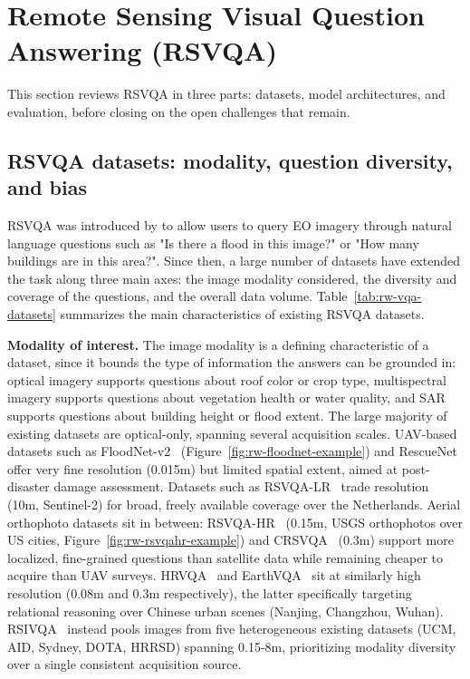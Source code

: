 \section{Remote Sensing Visual Question Answering (RSVQA)}
\label{sec:rw-vqa}
This section reviews RSVQA in three parts: datasets, model architectures, and evaluation, before closing on the open challenges that remain.
\subsection{RSVQA datasets: modality, question diversity, and bias}
\label{sec:rw-vqa-datasets}

RSVQA was introduced by \textcite{lobry2020rsvqa} to allow users to query EO imagery through natural language questions such as "Is there a flood in this image?" or "How many buildings are in this area?". Since then, a large number of datasets have extended the task along three main axes: the image modality considered, the diversity and coverage of the questions, and the overall data volume. Table~\ref{tab:rw-vqa-datasets} summarizes the main characteristics of existing RSVQA datasets.

\textbf{Modality of interest.} The image modality is a defining characteristic of a dataset, since it bounds the type of information the answers can be grounded in: optical imagery supports questions about roof color or crop type, multispectral imagery supports questions about vegetation health or water quality, and SAR supports questions about building height or flood extent. The large majority of existing datasets are optical-only, spanning several acquisition scales. UAV-based datasets such as FloodNet-v2~\cite{sarkar2023floodnet} (Figure~\ref{fig:rw-floodnet-example}) and RescueNet~\cite{sarkar2023rescuenet} offer very fine resolution (0.015m) but limited spatial extent, aimed at post-disaster damage assessment. Datasets such as RSVQA-LR~\cite{lobry2020rsvqa} trade resolution (10m, Sentinel-2) for broad, freely available coverage over the Netherlands. Aerial orthophoto datasets sit in between: RSVQA-HR~\cite{lobry2020rsvqa} (0.15m, USGS orthophotos over US cities, Figure~\ref{fig:rw-rsvqahr-example}) and CRSVQA~\cite{zhang2023crsvqa} (0.3m) support more localized, fine-grained questions than satellite data while remaining cheaper to acquire than UAV surveys. HRVQA~\cite{li2024hrvqa} and EarthVQA~\cite{wang2024earthvqa} sit at similarly high resolution (0.08m and 0.3m respectively), the latter specifically targeting relational reasoning over Chinese urban scenes (Nanjing, Changzhou, Wuhan). RSIVQA~\cite{zheng2021rsivqa} instead pools images from five heterogeneous existing datasets (UCM, AID, Sydney, DOTA, HRRSD) spanning 0.15-8m, prioritizing modality diversity over a single consistent acquisition source.

